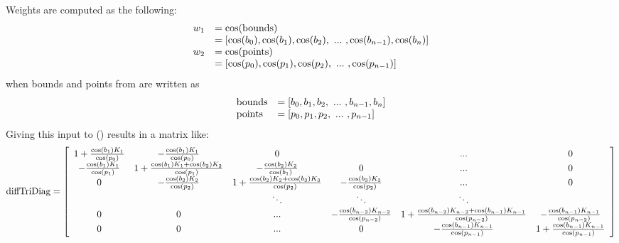 \documentclass[a4paper,10pt,english]{sphinxmanual}
\begin{document}
\begin{fulllineitems}
Weights are computed as the following:
\begin{gather}
\begin{split}\begin{array}{ll}
    w_1 &= \cos(\textrm{bounds}) \\
        &= \left[ \cos(b_0), \cos(b_1), \cos(b_2), \ ... \ , \cos(b_{n-1}), \cos(b_n) \right] \\
    w_2 &= \cos(\textrm{points}) \\
        &= \left[ \cos(p_0), \cos(p_1), \cos(p_2), \ ... \ , \cos(p_{n-1}) \right]
\end{array}\end{split}\notag
\end{gather}
when bounds and points from  are written as
\begin{gather}
\begin{split}\begin{array}{ll}    
    \textrm{bounds}   &= [b_0, b_1, b_2, \ ... \ , b_{n-1}, b_{n}] \\
    \textrm{points}   &= [p_0, p_1, p_2, \ ... \ , p_{n-1}]
\end{array}\end{split}\notag
\end{gather}
Giving this input to {\hyperref[api/climlab.dynamics:climlab.dynamics.diffusion._make_diffusion_matrix]{\emph{}}} () results in a matrix like:
\begin{gather}
\begin{split}\textrm{diffTriDiag}= 
\left[ \begin{array}{cccccc}
1+\frac{\cos(b_1) K_1 }{\cos(p_0)} & -\frac{\cos(b_1) K_1}{\cos(p_0)} & 0 &  & ... & 0  \\
-\frac{\cos(b_1) K_1}{\cos(p_1)} & 1+\frac{\cos(b_1) K_1 + \cos(b_2) K_2}{\cos(p_1)} & -\frac{\cos(b_2) K_2}{\cos(b_1)} & 0 & ... & 0 \\
0 & -\frac{\cos(b_2) K_2}{\cos(p_2)}  & 1+\frac{\cos(b_2) K_2 + \cos(b_3) K_3}{\cos(p_2)} & -\frac{\cos(b_3) K_3}{\cos(p_2)} &... & 0  \\
  &  & \ddots & \ddots & \ddots & \\
0 & 0 & ... & -\frac{\cos(b_{n-2}) K_{n-2}}{\cos(p_{n-2})}  & 1+\frac{\cos(b_{n-2}) K_{n-2} + \cos(b_{n-1}) K_{n-1}}{\cos(p_{n-2})} & -\frac{\cos(b_{n-1}) K_{n-1}}{\cos(p_{n-2})} \\
0 & 0 & ... & 0 & -\frac{\cos(b_{n-1}) K_{n-1}}{\cos(p_{n-1})}  & 1+\frac{\cos(b_{n-1}) K_{n-1}}{\cos(p_{n-1})} \\
\end{array} \right] \end{split}\notag
\end{gather}
\end{fulllineitems}
\end{document}
